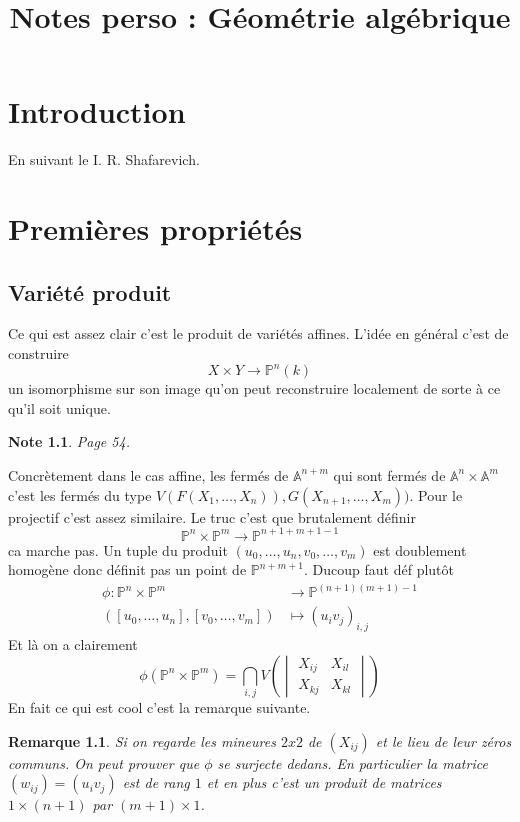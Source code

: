 \documentclass[a4paper,12pt]{book}
\title{Notes perso : Géométrie algébrique}
\date{}
\newcommand{\A}{\mathbb{A}}
\renewcommand{\Pr}{\mathbb{P}}
\theoremstyle{plain}
\newtheorem{rem}{Remarque}
\newtheorem{note}{Note}
\theoremstyle{definition}
\theoremstyle{remark}
\begin{document}
\maketitle
\tableofcontents

\chapter*{Introduction}
En suivant le I. R. Shafarevich.

\chapter{Premières propriétés}
\section{Variété produit}
Ce qui est assez clair c'est le produit de variétés affines. L'idée
en général c'est de construire 
\[X\times Y\to \Pr^n(k)\]
un isomorphisme sur son image qu'on peut reconstruire localement de 
sorte à ce qu'il soit unique. 
\begin{note}
    Page 54.
\end{note}
Concrètement dans le cas affine, les fermés de $\A^{n+m}$
qui sont fermés de $\A^n\times \A^m$ c'est les fermés du type
$V(F(X_1,\ldots, X_n)), G(X_{n+1},\ldots, X_m))$. Pour le projectif
c'est assez similaire. Le truc c'est que brutalement définir
\[\Pr^n\times \Pr^m\to \Pr^{n+1+m+1-1}\]
ca marche pas. Un tuple du produit $(u_0,\ldots, u_n, v_0,\ldots, v_m)$
est doublement homogène donc définit pas un point de $\Pr^{n+m+1}$. 
Ducoup faut déf plutôt
\begin{align*}
    \phi\colon\Pr^n\times \Pr^m&\to \Pr^{(n+1)(m+1)-1}\\
([u_0,\ldots, u_n],[v_0,\ldots, v_m])&\mapsto (u_iv_j)_{i,j}
\end{align*}
Et là on a clairement 
\[\phi(\Pr^n\times \Pr^m)=\bigcap_{i,j}V\left(\begin{vmatrix}
X_{ij}& X_{il}\\ X_{kj}&X_{kl}\end{vmatrix}\right)\]
En fait ce qui est cool c'est la remarque suivante.
\begin{rem}
    Si on regarde les mineures $2x2$ de $(X_{ij})$ et le lieu de leur
    zéros communs. On peut prouver que $\phi$ se surjecte dedans. En
    particulier la matrice $(w_{ij})=(u_iv_j)$ est de rang $1$ et en plus
    c'est un produit de matrices $1\times (n+1)$ par $(m+1)\times 1$.
\end{rem}
\end{document}

